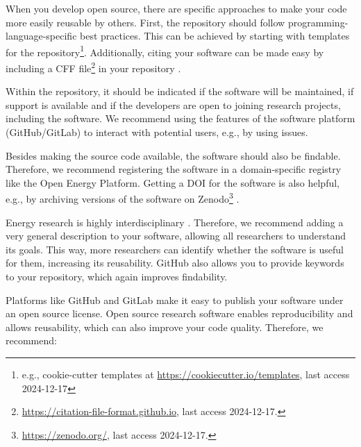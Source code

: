 When you develop open source, there are specific approaches to make your code more easily reusable by others. First, the repository should follow programming-language-specific best practices. This can be achieved by starting with templates for the repository\footnote{e.g., cookie-cutter templates at \url{https://cookiecutter.io/templates}, last access 2024-12-17}. Additionally, citing your software can be made easy by including a \ac{CFF} file\footnote{\url{https://citation-file-format.github.io}, last access 2024-12-17.} in your repository
 \cite{druskat_citation_2021}.

Within the repository, it should be indicated if the software will be maintained, if support is available and if the developers are open to joining research projects, including the software. We recommend using the features of the software platform (GitHub/GitLab) to interact with potential users, e.g., by using issues.

Besides making the source code available, the software should also be findable. Therefore, we recommend registering the software in a domain-specific registry like the Open Energy Platform. Getting a DOI for the software is also helpful, e.g., by archiving versions of the software on Zenodo\footnote{\url{https://zenodo.org/}, last access 2024-12-17.} \cite{zenodo}. 

\par
Energy research is highly interdisciplinary \cite{tijssen_quantitative_1992}.
Therefore, we recommend adding a very general description to your software, allowing all researchers to understand its goals. This way, more researchers can identify whether the software is useful for them, increasing its reusability. GitHub also allows you to provide keywords to your repository, which again improves findability.


\par 
Platforms like GitHub and GitLab make it easy to publish your software under an open source license. Open source research software enables reproducibility and allows reusability, which can also improve your code quality. Therefore, we recommend: 

